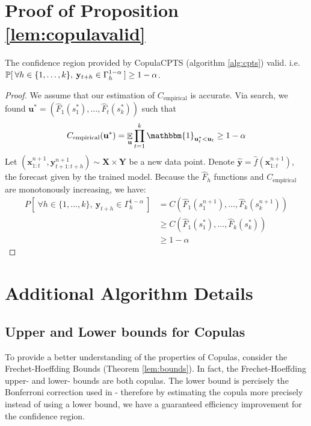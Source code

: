 \section{Proof of Proposition \ref{lem:copulavalid}}
\label{app:proof}
\begin{prop*}
The confidence region provided by CopulaCPTS (algorithm \ref{alg:cpts})  valid. i.e. $ {\mathbb{P}}[\: \forall h \in \{1,\ldots, k\}, \: \mathbf{y}_{t+h} \in \Gamma^{1-\alpha}_h\: ] \geq 1-\alpha$.
\end{prop*}

\begin{proof}
We assume that our estimation of $C_{\text{empirical}}$ is accurate. Via search, we found  $\mathbf{u^*} = (\hat{F}_1(s^*_1), \ldots, \hat{F}_t(s^*_k))$ such that
\begin{align}
    C_{\text{empirical}} (\mathbf{u^*}) = \displaystyle \mathop{\mathbb{E}}_\textbf{u}  \prod_{t=1}^{k}  \mathbbm{1}_{\mathbf{u}^*_t <\mathbf{u}_t} \geq 1-\alpha
\end{align}
Let $(\mathbf{x}_{1:t}^{n+1}, \mathbf{y}_{t+1:t+h}^{n+1}) \sim \mathbf{X}\times \mathbf{Y}$ be a new data point. Denote $\hat{\mathbf{y}} = \hat{f}(\mathbf{x}_{1:t}^{n+1})$, the forecast given by the trained model. Because the $\hat{F}_h$ functions and $C_{\text{empirical}}$ are monotonously increasing, we have:
\begin{align*}
    P[\: \forall h \in \{1,\ldots, k\}, \: \mathbf{y}_{t+h} \in \Gamma^{1-\alpha}_h\: ] 
    &= C(\hat{F}_1(s^{n+1}_1), \ldots, \hat{F}_k(s^{n+1}_k))\\
    &\geq  C( \hat{F}_1(s^*_1), \ldots, \hat{F}_k(s^*_k)) \\
    &\geq 1-\alpha
\end{align*} 
\end{proof}


\section{Additional Algorithm Details}

\subsection{Upper and Lower bounds for Copulas}
To provide a better understanding of the properties of Copulas, consider the Frechet-Hoeffding Bounds (Theorem \ref{lem:bounds}). In fact, the Frechet-Hoeffding upper- and lower- bounds are both copulas. The lower bound is percisely the Bonferroni correction used in \cite{Schaar2021conformaltime} - therefore by estimating the copula more precisely instead of using a lower bound, we have a guaranteed efficiency improvement for the confidence region. 

